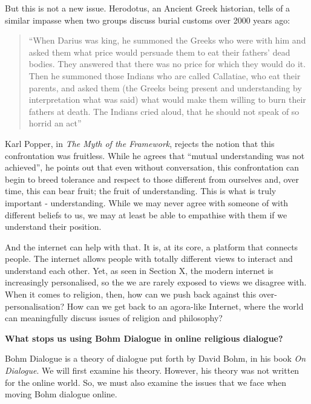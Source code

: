 \documentclass[]{article}
\begin{document}
But this is not a new issue. Herodotus, an Ancient Greek historian,
tells of a similar impasse when two groups discuss burial customs over
2000 years ago:

\begin{quote}
``When Darius was king, he summoned the Greeks who were with him and
asked them what price would persuade them to eat their fathers' dead
bodies. They answered that there was no price for which they would do
it. Then he summoned those Indians who are called Callatiae, who eat
their parents, and asked them (the Greeks being present and
understanding by interpretation what was said) what would make them
willing to burn their fathers at death. The Indians cried aloud, that he
should not speak of so horrid an
act''\autocite{HerodotusHistoryHerodotus1910}
\end{quote}

Karl Popper, in \emph{The Myth of the Framework}, rejects the notion
that this confrontation was fruitless. While he agrees that ``mutual
understanding was not
achieved''\autocite[pg 37]{PopperMythFrameworkdefence1997}, he points
out that even without conversation, this confrontation can begin to
breed tolerance and respect to those different from ourselves and, over
time, this can bear fruit; the fruit of
understanding\autocite{PopperMythFrameworkdefence1997}. This is what is
truly important - understanding. While we may never agree with someone
of with different beliefs to us, we may at least be able to empathise
with them if we understand their position.

And the internet can help with that. It is, at its core, a platform that
connects people. The internet allows people with totally different views
to interact and understand each other. Yet, as seen in Section X, the
modern internet is increasingly personalised, so the we are rarely
exposed to views we disagree with. When it comes to religion, then, how
can we push back against this over-personalisation? How can we get back
to an agora-like Internet, where the world can meaningfully discuss
issues of religion and philosophy?

\newpage 

\textbf{What stops us using Bohm Dialogue in online religious dialogue?}

Bohm Dialogue is a theory of dialogue put forth by David Bohm, in his
book \emph{On Dialogue}\autocite{BohmDialogue2004}. We will first
examine his theory. However, his theory was not written for the online
world. So, we must also examine the issues that we face when moving Bohm
dialogue online.
\end{document}
